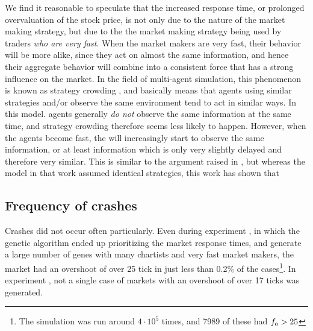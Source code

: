 We find it reasonable to speculate that the increased response time, or prolonged overvaluation of the stock price, is not only due to the nature of the market making strategy, but due to the the market making strategy being used by traders \textit{who are very fast}. When the market makers are very fast, their behavior will be more alike, since they act on almost the same information, and hence their aggregate behavior will combine into a consistent force that has a strong influence on the market. In the field of multi-agent simulation, this phenomenon is known as strategy crowding \cite{macal2005tutorial}, and basically means that agents using similar strategies and/or observe the same environment tend to act in similar ways. In this model. agents generally \textit{do not} observe the same information at the same time, and strategy crowding therefore seems less likely to happen. However, when the agents become fast, the will increasingly start to observe the same information, or at least information which is only very slightly delayed and therefore very similar. This is similar to the argument raised in \cite{}, but whereas the model in that work assumed identical strategies, this work has shown that 

\subsection{Frequency of crashes}
Crashes did not occur often particularly. Even during experiment \deleven, in which the genetic algorithm ended up prioritizing the market response times, and generate a large number of genes with many chartists and very fast market makers, the market had an overshoot of over 25 tick in just less than 0.2\% of the cases\footnote{The simulation was run around $4\cdot 10^5$ times, and 7989 of these had $f_\text{o} > 25$}. In experiment \dten, not a single case of markets with an overshoot of over 17 ticks was generated. 





